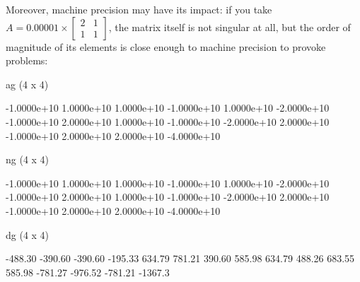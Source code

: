 Moreover, machine precision may have its impact: if you take $A =
0.00001 \times \left[\begin{array}{cc} 2 & 1\\ 1 &
    1 \end{array}\right]$, the matrix itself is not singular at
all, but the order of magnitude of its elements is close enough to
machine precision to provoke problems:
\begin{code}
ag (4 x 4)

 -1.0000e+10   1.0000e+10   1.0000e+10  -1.0000e+10 
  1.0000e+10  -2.0000e+10  -1.0000e+10   2.0000e+10 
  1.0000e+10  -1.0000e+10  -2.0000e+10   2.0000e+10 
 -1.0000e+10   2.0000e+10   2.0000e+10  -4.0000e+10 

ng (4 x 4)

 -1.0000e+10   1.0000e+10   1.0000e+10  -1.0000e+10 
  1.0000e+10  -2.0000e+10  -1.0000e+10   2.0000e+10 
  1.0000e+10  -1.0000e+10  -2.0000e+10   2.0000e+10 
 -1.0000e+10   2.0000e+10   2.0000e+10  -4.0000e+10 

dg (4 x 4)

     -488.30      -390.60      -390.60      -195.33 
      634.79       781.21       390.60       585.98 
      634.79       488.26       683.55       585.98 
     -781.27      -976.52      -781.21      -1367.3 
\end{code}

